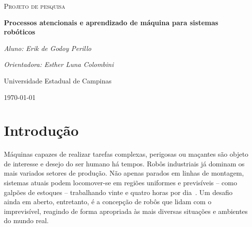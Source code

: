 \documentclass[11pt]{article}
\begin{document}
\begin{titlepage}
	\centering
	{\scshape\Large Projeto de pesquisa\par}
	\vspace{1.5cm}
	{\huge\bfseries Processos atencionais e aprendizado de máquina 
		para sistemas robóticos\par}
	\vspace{1cm}
	{\itshape Aluno: Erik de Godoy Perillo\par}
	{\itshape Orientadora: Esther Luna Colombini\par}
	\vspace{0.5cm}
	\begin{abstract}
		Entender o ambiente ao seu redor é uma tarefa fundamental para 
		o desafio de se obter máquinas autônomas que interagem com o 
		ambiente de forma semelhante à nossa.
		A alta dimensionalidade dos dados captados por sensores usados para 
		este fim é em geral problemática pois muitas vezes há
		redundância e irrelevância de informação. 
		Neste projeto, propomos o uso de processos atencionais em cascata 
		com aprendizado de máquina a fim de se obter um sistema de 
		identificação de classificação de objetos em um dado ambiente
		que seja eficiente, preciso e geral. 
		Por fim, planeja-se implementar uma estrutura que permita o uso das
		técnicas por projetos robóticos em geral em GPUs embarcadas.
	\end{abstract}
	\vfill
	Universidade Estadual de Campinas 
	\vfill
	{\large \today\par}
\end{titlepage}

\newpage

\section{Introdução}
\paragraph{}
Máquinas capazes de realizar tarefas complexas, perigosas ou maçantes são
objeto de interesse e desejo do ser humano há tempos. 
Robôs industriais já dominam os mais variados setores de produção. 
Não apenas parados em linhas de montagem, sistemas atuais podem locomover-se
em regiões uniformes e previsíveis -- como galpões de estoques -- trabalhando
vinte e quatro horas por dia~\cite{warehouse}.
Um desafio ainda em aberto, entretanto, é a concepção de robôs que lidam com 
o imprevisível, reagindo de forma apropriada às mais diversas situações 
e ambientes do mundo real. 
\end{document}
